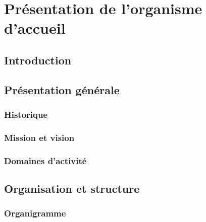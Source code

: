 
\chapter{Présentation de l'organisme d'accueil}
\label{chap:presentation}

\section{Introduction}


\section{Présentation générale}


\subsection{Historique}


\subsection{Mission et vision}


\subsection{Domaines d'activité}


\section{Organisation et structure}


\subsection{Organigramme}


